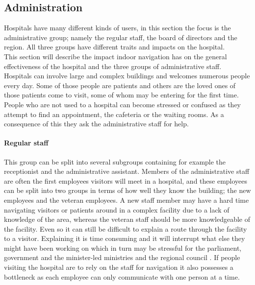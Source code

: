 \subsection{Administration}

Hospitals have many different kinds of users, in this section the focus is the administrative group; namely the regular staff, the board of directors and the region. All three groups have different traits and impacts on the hospital. \\ This section will describe the impact indoor navigation has on the general effectiveness of the hospital and the three groups of administrative staff.\\
Hospitals can involve large and complex buildings \cite{wifi_navigation_ca} and welcomes numerous people every day. Some of those people are patients and others are the loved ones of those patients come to visit, some of whom may be entering for the first time. People who are not used to a hospital can become stressed or confused as they attempt to find an appointment, the cafeteria or the waiting rooms. As a consequence of this they ask the administrative staff for help. \cite{Frivillige_guider}

\paragraph{Regular staff}
This group can be split into several subgroups containing for example the receptionist and the administrative assistant. Members of the administrative staff are often the first employees visitors will meet in a hospital, and these employees can be split into two groups in terms of how well they know the building; the new employees and the veteran employees. A new staff member may have a hard time navigating visitors or patients around in a complex facility due to a lack of knowledge of the area, whereas the veteran staff should be more knowledgeable of the facility. Even so it can still be difficult to explain a route through the facility to a visitor. Explaining it is time consuming and it will interrupt what else they might have been working on which in turn may be stressful for the parliament, government and the minister-led ministries and the regional council \cite{arbejdsmiljo_ca}. If people visiting the hospital are to rely on the staff for navigation it also possesses a bottleneck as each employee can only communicate with one person at a time.

